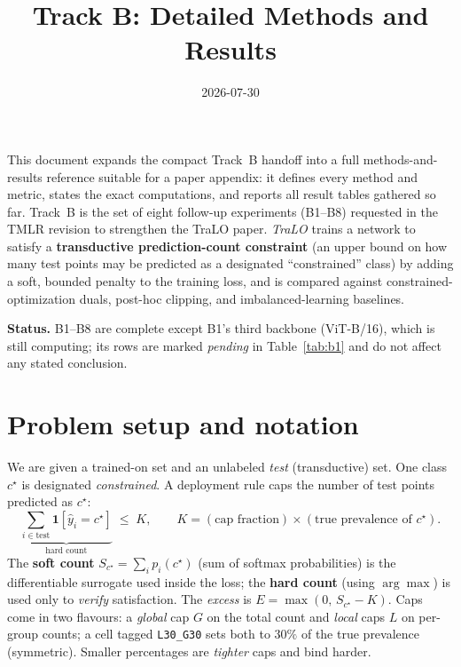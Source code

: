 \documentclass[11pt,a4paper]{article}
\title{\vspace{-1.4em}\textbf{Track B: Detailed Methods and Results}}
\author{}
\date{2026-07-30}
\begin{document}
\maketitle
\vspace{-2em}

\noindent This document expands the compact Track~B handoff into a full methods-and-results reference suitable
for a paper appendix: it defines every method and metric, states the exact computations, and reports all
result tables gathered so far. Track~B is the set of eight follow-up experiments (B1--B8) requested in the TMLR
revision to strengthen the TraLO paper. \emph{TraLO} trains a network to satisfy a \textbf{transductive
prediction-count constraint} (an upper bound on how many test points may be predicted as a designated
``constrained'' class) by adding a soft, bounded penalty to the training loss, and is compared against
constrained-optimization duals, post-hoc clipping, and imbalanced-learning baselines.

\medskip
\noindent\textbf{Status.} B1--B8 are complete except B1's third backbone (ViT-B/16), which is still computing;
its rows are marked \emph{pending} in Table~\ref{tab:b1} and do not affect any stated conclusion.

\section{Problem setup and notation}
We are given a trained-on set and an unlabeled \emph{test} (transductive) set. One class $c^\star$ is
designated \emph{constrained}. A deployment rule caps the number of test points predicted as $c^\star$:
\begin{equation}
\underbrace{\textstyle\sum_{i\in\text{test}} \mathbf{1}[\hat y_i = c^\star]}_{\text{hard count}} \;\le\; K,
\qquad K = (\text{cap fraction})\times(\text{true prevalence of }c^\star).
\end{equation}
The \textbf{soft count} $S_{c^\star}=\sum_i p_i(c^\star)$ (sum of softmax probabilities) is the differentiable
surrogate used inside the loss; the \textbf{hard count} (using $\arg\max$) is used only to \emph{verify}
satisfaction. The \emph{excess} is $E=\max(0,\,S_{c^\star}-K)$. Caps come in two flavours: a \emph{global} cap
$G$ on the total count and \emph{local} caps $L$ on per-group counts; a cell tagged \texttt{L30\_G30} sets both
to $30\%$ of the true prevalence (symmetric). Smaller percentages are \emph{tighter} caps and bind harder.
\end{document}
